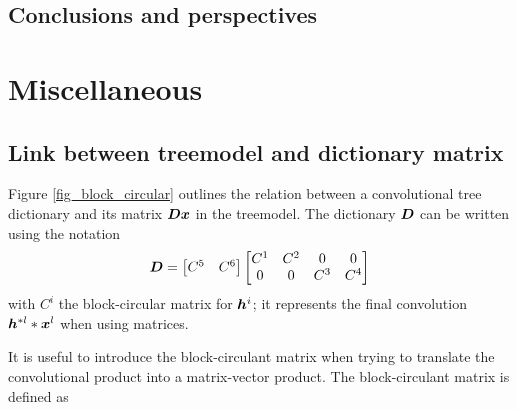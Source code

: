 \section{Conclusions and perspectives}



\clearpage
{}
\appendix

\chapter{Miscellaneous}


\section{Link between \gls{treemodel} and dictionary matrix}\label{sec_matrix_vs_tree} %

Figure \ref{fig_block_circular} outlines the relation between a convolutional tree   dictionary and its matrix $\bm{D}\bm{x}$ in the \gls{treemodel}. The dictionary $\bm{D}$ can be written using the notation
$$\bm{D} = \begin{bmatrix}C^5 & C^6\end{bmatrix} \begin{bmatrix}C^1 & C^2 & 0 & 0 \\0 & 0 & C^3 & C^4\end{bmatrix}$$
with $C^i$ the block-circular matrix for $\bm{h}^i$; it represents the final convolution $\bm{h}^{*l}*\bm{x}^l$ when using matrices.

It is useful to introduce the block-circulant matrix when trying to translate the convolutional product into a matrix-vector product. The block-circulant matrix is defined as

